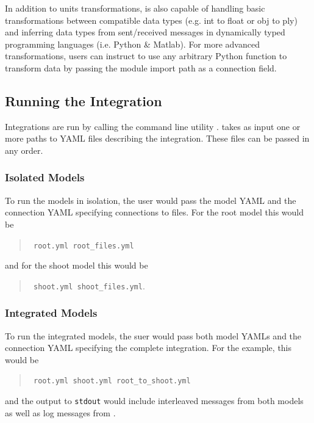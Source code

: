 \documentclass[journal]{IEEEtran}
\newcommand{\todo}[1]{{\color{red}{#1}}}
\newcommand{\pkg}{{\tt \todo{cis\_interface}}{}}
\newcommand{\pkgrun}{{\tt \todo{cisrun}}}
\begin{document}
In addition to units transformations, {\pkg} is also capable of handling basic transformations between compatible data types (e.g. int to float or obj to ply) and inferring data types from sent/received messages in dynamically typed programming languages (i.e. Python \& Matlab). For more advanced transformations, users can instruct {\pkg} to use any arbitrary Python function to transform data by passing the module import path as a connection field.

\subsection{Running the Integration}
%
Integrations are run by calling the command line utility {\pkgrun}. {\pkgrun} takes as input one or more paths to YAML files describing the integration. These files can be passed in any order.

\subsubsection{Isolated Models}
%
To run the models in isolation, the user would pass {\pkgrun} the model YAML and the connection YAML specifying connections to files. For the root model this would be 
%
\begin{quote}
{\tt {\pkgrun} root.yml root\_files.yml} 
\end{quote}
%
and for the shoot model this would be 
%
\begin{quote}
{\tt {\pkgrun} shoot.yml shoot\_files.yml}. 
\end{quote}

\subsubsection{Integrated Models}
%
To run the integrated models, the suer would pass {\pkgrun} both model YAMLs and the connection YAML specifying the complete integration. For the example, this would be 
\begin{quote}
{\tt {\pkgrun} root.yml shoot.yml root\_to\_shoot.yml}
\end{quote}
and the output to {\tt stdout} would include interleaved messages from both models as well as log messages from {\pkg}.

\end{document}
